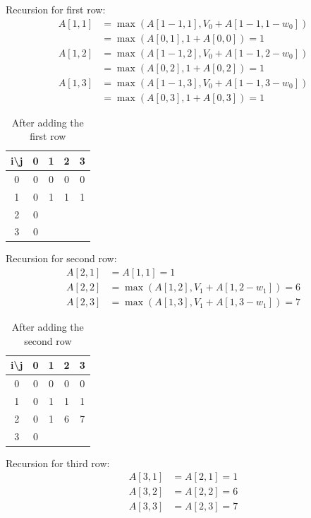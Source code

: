 \documentclass[a4paper,11pt]{book}
\begin{document}
\noindent Recursion for first row:
\begin{align*}
    A[1,1] &= \max(A[1-1,1], V_0 + A[1-1,1-w_0])\\
           &= \max(A[0,1], 1 + A[0,0]) = 1 \\
    A[1,2] &= \max(A[1-1,2], V_0 + A[1-1,2-w_0])\\
           &= \max(A[0,2], 1 + A[0,2]) = 1 \\
    A[1,3] &= \max(A[1-1,3], V_0 + A[1-1,3-w_0])\\
           &= \max(A[0,3], 1 + A[0,3]) = 1
\end{align*}

\begin{table}[ht]
\centering
\begin{tabular}{|c|c|c|c|c|}
\hline
i\textbackslash{}j & 0 & 1 & 2 & 3 \\ \hline
0                  & 0 & 0 & 0 & 0 \\ \hline
1                  & 0 & 1 & 1 & 1 \\ \hline
2                  & 0 &   &   &   \\ \hline
3                  & 0 &   &   &   \\ \hline
\end{tabular}
\caption{After adding the first row}
\end{table}

\noindent Recursion for second row:
\begin{align*}
    A[2,1] &= A[1,1] = 1\\
    A[2,2] &= \max(A[1,2], V_1 + A[1,2-w_1]) = 6\\
    A[2,3] &= \max(A[1,3], V_1 + A[1,3-w_1]) = 7
\end{align*}

\begin{table}[ht]
\centering
\begin{tabular}{|c|c|c|c|c|}
\hline
i\textbackslash{}j & 0 & 1 & 2 & 3 \\ \hline
0                  & 0 & 0 & 0 & 0 \\ \hline
1                  & 0 & 1 & 1 & 1 \\ \hline
2                  & 0 & 1 & 6 & 7 \\ \hline
3                  & 0 &   &   &   \\ \hline
\end{tabular}
\caption{After adding the second row}
\end{table}

\noindent Recursion for third row:
\begin{align*}
    A[3,1] &= A[2,1] = 1\\
    A[3,2] &= A[2,2] = 6\\
    A[3,3] &= A[2,3] = 7
\end{align*}
\end{document}
